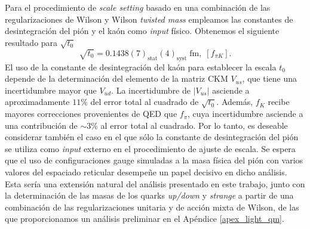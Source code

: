 Para el procedimiento de \textit{scale setting} basado en una combinación de las regularizaciones de Wilson y Wilson \textit{twisted mass} empleamos las constantes de desintegración del pión y el kaón como \textit{input} físico. Obtenemos el siguiente resultado para $\sqrt{t_0}$
\begin{equation}
\sqrt{t_0}=0.1438(7)_{\textrm{stat}}(4)_{\textrm{syst}}\;\textrm{fm},\;[f_{\pi K}].
\end{equation}
El uso de la constante de desintegración del kaón para establecer la escala $t_0$ depende de la determinación del elemento de la matriz CKM $V_{us}$, que tiene una incertidumbre mayor que $V_{ud}$. La incertidumbre de $|V_{us}|$ asciende a aproximadamente $11\%$ del error total al cuadrado de $\sqrt{t_0}$. Además, $f_K$ recibe mayores correcciones provenientes de QED que $f_{\pi}$, cuya incertidumbre asciende a una contribución de $\sim3\%$ al error total al cuadrado. Por lo tanto, es deseable considerar también el caso en el que sólo la constante de desintegración del pión se utiliza como \textit{input} externo en el procedimiento de ajuste de escala. Se espera que el uso de configuraciones gauge simuladas a la masa física del pión con varios valores del espaciado reticular desempeñe un papel decisivo en dicho análisis. Esta sería una extensión natural del análisis presentado en este trabajo, junto con la determinación de las masas de los quarks \textit{up/down} y \textit{strange} a partir de una combinación de las regularizaciones unitaria y de acción mixta de Wilson, de las que proporcionamos un análisis preliminar en el Apéndice \ref{apex_light_qm}.


